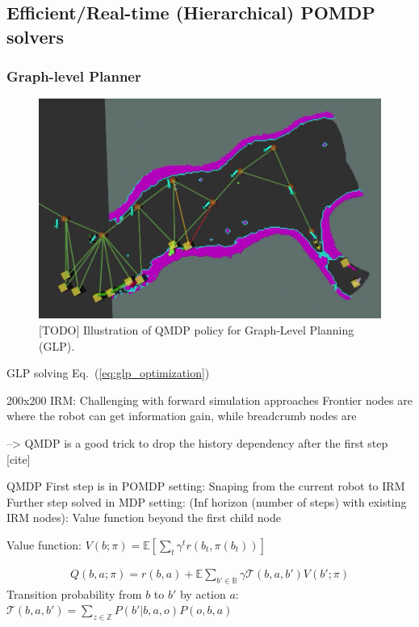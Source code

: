 \documentclass[letterpaper]{article} %
\begin{document}
\subsection{Efficient/Real-time (Hierarchical) POMDP solvers} \label{ssec:belief-planners}


\subsubsection{Graph-level Planner} \label{sssec:GLP}
\begin{figure}[t!]
  \centering
  \includegraphics[width=0.8\columnwidth]{figures/QMDP-for-GLP.png}
  \caption{[TODO] Illustration of QMDP policy for Graph-Level Planning (GLP).}
  \label{fig:graph-level-planner}
\end{figure}


GLP solving Eq.~(\ref{eq:glp_optimization})

200x200 IRM: Challenging with forward simulation approaches
Frontier nodes are where the robot can get information gain, while breadcrumb nodes are 

--> QMDP is a good trick to drop the history dependency after the first step [cite]

QMDP
First step is in POMDP setting: Snaping from the current robot to IRM
Further step solved in MDP setting: (Inf horizon (number of steps) with existing IRM nodes): Value function beyond the first child node


Value function:
$V(b; \pi) = \mathbb{E} [\sum_t \gamma^t r(b_t, \pi(b_t))]$

\begin{align}
  Q(b, a; \pi) = r(b, a) + \mathbb{E} \sum_{b' \in \mathbb{B}} \gamma \mathcal{T}(b, a, b') V(b'; \pi)
  \label{eq:q_function}
\end{align}
Transition probability from $b$ to $b'$ by action $a$: $\mathcal{T}(b, a, b') = \sum_{z \in \mathbb{Z}} P(b' | b, a, o) P(o, b, a)$
\end{document}
